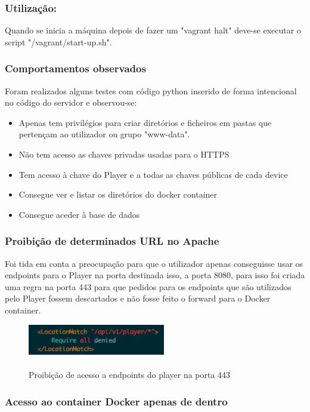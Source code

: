\documentclass[pdftex,12pt,a4paper]{report}
\begin{document}
\subsubsection{Utilização:}
Quando se inicia a máquina depois de fazer um "vagrant halt" deve-se executar o script "/vagrant/start-up.sh". 

\subsubsection{Comportamentos observados}
Foram realizados alguns testes com código python inserido de forma intencional no código do servidor e observou-se:

\begin{itemize}
\item Apenas tem privilégios para criar diretórios e ficheiros em pastas que pertençam ao utilizador ou grupo "www-data".
\item Não tem acesso as chaves privadas usadas para o HTTPS
\item Tem acesso à chave do Player e a todas as chaves públicas de cada device
\item Consegue ver e listar os diretórios do docker container
\item Consegue aceder à base de dados
\end{itemize}

\subsubsection{Proibição de determinados URL no Apache}

Foi tida em conta a preocupação para que o utilizador apenas conseguisse usar os endpoints para o Player na porta destinada isso, a porta 8080, para isso foi criada uma regra na porta 443 para que pedidos para os endpoints que são utilizados pelo Player fossem descartados e não fosse feito o forward para o Docker container.

\begin{figure}[!htb]
\center
 \includegraphics[width=60mm,scale=1]{player_denied.png}
 \caption{\\Proibição de acesso a endpoints do player na porta 443}
 \label{fig:docker_c}
\end{figure}

\subsubsection{Acesso ao container Docker apenas de dentro}
\end{document}
